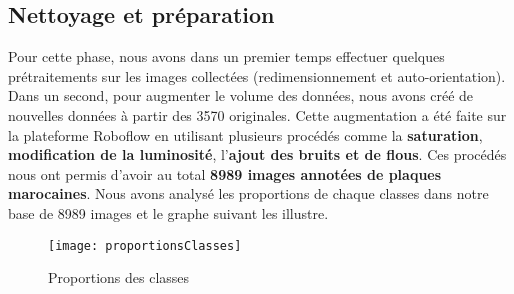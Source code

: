     \subsection{Nettoyage et préparation}
    Pour cette phase, nous avons dans un premier temps effectuer quelques prétraitements sur les images collectées (redimensionnement et auto-orientation). Dans un second, pour augmenter le volume des données, nous avons créé de nouvelles données à partir des 3570 originales. Cette augmentation a été faite sur la plateforme Roboflow en utilisant plusieurs procédés comme la \textbf{saturation}, \textbf{modification de la luminosité}, l’\textbf{ajout des bruits et de flous}. Ces procédés nous ont permis d’avoir au total \textbf{8989 images annotées de plaques marocaines}. Nous avons analysé les proportions de chaque classes dans notre base de 8989 images et le graphe suivant les illustre. 
        \begin{figure}[H]
            \centering
            \texttt{[image: proportionsClasses]}
            \caption{Proportions des classes}
        \end{figure}
